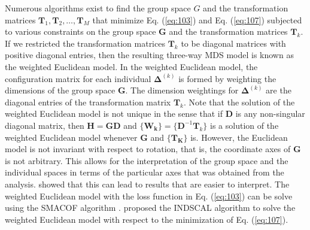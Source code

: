 \noindent Numerous algorithms exist to find the group space $G$ and
the transformation matrices $\mathbf{T}_1, \mathbf{T}_{2}, \dots,
\mathbf{T}_M$ that minimize Eq. (\ref{eq:103}) and Eq. (\ref{eq:107})
subjected to various constraints on the group space $\mathbf{G}$ and
the transformation matrices $\mathbf{T}_k$. If we restricted the
transformation matrices $\mathbf{T}_k$ to be diagonal matrices with
positive diagonal entries, then the resulting three-way MDS model is
known as the weighted Euclidean model. In the weighted Euclidean
model, the configuration matrix for each individual
$\bm{\Delta}^{(k)}$ is formed by weighting the dimensions of the group
space $\mathbf{G}$. The dimension weightings for $\bm{\Delta}^{(k)}$
are the diagonal entries of the transformation matrix
$\mathbf{T}_k$. Note that the solution of the weighted Euclidean model
is not unique in the sense that if $\mathbf{D}$ is any non-singular
diagonal matrix, then $\mathbf{H} = \mathbf{G} \mathbf{D}$ and
$\{\mathbf{W_k}\} = \{\mathbf{D}^{-1} \mathbf{T}_k\}$ is a solution
of the weighted Euclidean model whenever $\mathbf{G}$ and
$\{\mathbf{T_K}\}$ is. However, the Euclidean model is not
invariant with respect to rotation, that is, the coordinate axes of
$\mathbf{G}$ is not arbitrary. This allows for the interpretation of
the group space and the individual spaces in terms of the particular
axes that was obtained from the
analysis. \citet{carroll70:_analy_n_eckar_young} showed that this can
lead to results that are easier to interpret. The weighted Euclidean
model with the loss function in Eq. (\ref{eq:103}) can be solve using
the SMACOF algorithm
\citep{leeuw80:_multiv,leeuw09:_multid_scalin_using_major}.
\citet{carroll70:_analy_n_eckar_young} proposed the INDSCAL algorithm
to solve the weighted Euclidean model with
respect to the minimization of Eq. (\ref{eq:107}). \\ \\

